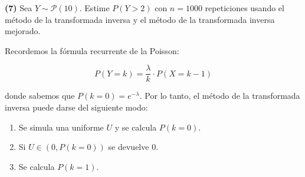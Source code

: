 \documentclass[a4paper, 12pt]{article}
\begin{document}
\begin{myframe}
  \textbf{(7)} Sea $Y \sim \mathcal{P}\left( 10 \right) $. Estime $P(Y > 2)$ con $n = 1000$
  repeticiones usando el método de la transformada inversa y el método de la
  transformada inversa mejorado.
\end{myframe}

Recordemos la fórmula recurrente de la Poisson:

\begin{equation*}
  P(Y = k) = \frac{\lambda}{k} \cdot P(X = k-1)
\end{equation*}

donde sabemos que $P(k = 0) = e^{-\lambda}$. Por lo tanto, el método de la
transformada inversa puede darse del siguiente modo:

\begin{enumerate}
  \item Se simula una uniforme $U$ y se calcula $P(k = 0)$.
  \item Si $U \in (0, P(k = 0))$ se devuelve $0$. 
  \item Se calcula $P(k = 1)$.
\end{enumerate}

\pagebreak 
\end{document}
